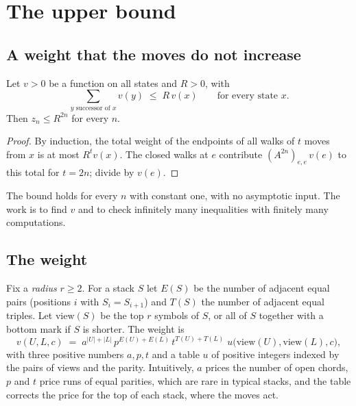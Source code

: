\section{The upper bound}\label{sec:upper}

\subsection{A weight that the moves do not increase}

\begin{lemma}\label{lem:subinv}
Let $v>0$ be a function on all states and $R>0$, with
\[ \sum_{y\text{ successor of }x} v(y)\;\le\;R\,v(x)\qquad\text{for every state }x. \]
Then $z_n\le R^{2n}$ for every $n$.
\end{lemma}

\begin{proof}
By induction, the total weight of the endpoints of all walks of $t$ moves from $x$ is at most $R^tv(x)$. The closed
walks at $e$ contribute $(A^{2n})_{e,e}\,v(e)$ to this total for $t=2n$; divide by $v(e)$.
\end{proof}

The bound holds for every $n$ with constant one, with no asymptotic input. The work is to find $v$ and to check
infinitely many inequalities with finitely many computations.

\subsection{The weight}

Fix a \emph{radius} $r\ge2$. For a stack $S$ let $E(S)$ be the number of adjacent equal pairs (positions $i$ with
$S_i=S_{i+1}$) and $T(S)$ the number of adjacent equal triples. Let $\mathrm{view}(S)$ be the top $r$ symbols of $S$,
or all of $S$ together with a bottom mark if $S$ is shorter. The weight is
\[ v(U,L,c)\;=\;a^{|U|+|L|}\,p^{E(U)+E(L)}\,t^{T(U)+T(L)}\;u\bigl(\mathrm{view}(U),\mathrm{view}(L),c\bigr), \]
with three positive numbers $a,p,t$ and a table $u$ of positive integers indexed by the pairs of views and the
parity. Intuitively, $a$ prices the number of open chords, $p$ and $t$ price runs of equal parities, which are rare
in typical stacks, and the table corrects the price for the top of each stack, where the moves act.

